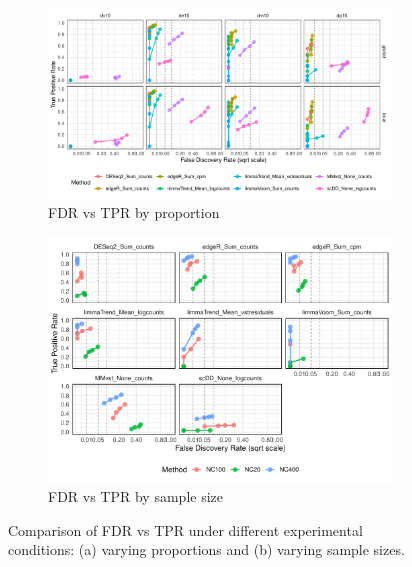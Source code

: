 \documentclass[a4paper, 11pt, twocolumn]{article}
\begin{document}
\begin{figure}[H]
	\centering
	\begin{subfigure}[t]{0.9\textwidth}
		\centering
		\includegraphics[width=\textwidth]{figs/fdrtpr_prop_method_Kang.pdf}
		\caption{FDR vs TPR by proportion}
		\label{fig:fdrtpr_prop_kang}
	\end{subfigure}
	
	\vspace{1em}
	
	\begin{subfigure}[t]{0.8\textwidth}
		\centering
		\includegraphics[width=\textwidth]{figs/fdrtpr_size_method_Kang.pdf}
		\caption{FDR vs TPR by sample size}
		\label{fig:fdrtpr_size}
	\end{subfigure}
	
	\caption{Comparison of FDR vs TPR under different experimental conditions: (a) varying proportions and (b) varying sample sizes.}
	\label{fig:fdrtpr_combined_kang}
\end{figure}
\end{document}
